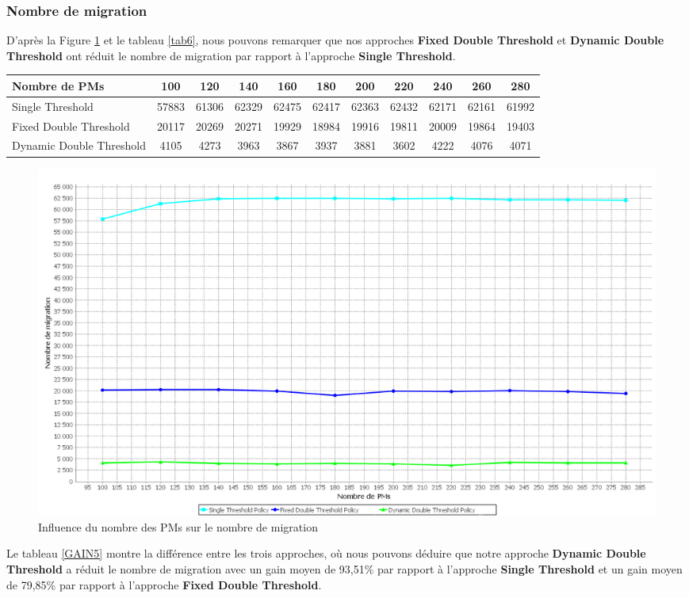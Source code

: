 \begin{onehalfspace}
\subsubsection{Nombre de migration}
D’après la Figure \ref{InNVMEnM1} et le tableau \ref{tab6}, nous pouvons remarquer que nos approches \textbf{Fixed Double Threshold} et \textbf{Dynamic Double Threshold} ont réduit le nombre de migration par rapport à l’approche \textbf{Single Threshold}.
\begin{center}
{\scriptsize   \begin{tabular}{|p{2.5cm}|c|c|c|c|c|c|c|c|c|c|}
\hline
      \centering     Nombre de PMs & 100& 120& 140& 160& 180& 200& 220& 240& 260& 280\\
\hline
      \centering      Single Threshold &  57883& 61306& 62329& 62475& 62417& 62363& 62432& 62171& 62161& 61992\\
\hline
      \centering      Fixed Double Threshold &  20117& 20269& 20271& 19929& 18984& 19916& 19811& 20009& 19864& 19403\\
\hline
      \centering     Dynamic Double Threshold &  4105& 4273& 3963& 3867& 3937& 3881& 3602& 4222& 4076& 4071\\
\hline
\end{tabular}}
\label{tab6}
\end{center}
\clearpage
\begin{figure}[!h]
\begin{center}
\includegraphics[scale=0.35]{figures/sh5.png} 
\end{center}
\caption{Influence du nombre des PMs sur le nombre de migration}
\label{InNVMEnM1}
\end{figure}


Le tableau \ref{GAIN5} montre la différence entre les trois approches, où nous pouvons déduire que notre approche \textbf{Dynamic Double Threshold} a réduit le nombre de migration avec un gain moyen de 93,51\% par rapport à l'approche \textbf{Single Threshold} et un gain moyen de 79,85\% par rapport à l'approche \textbf{Fixed Double Threshold}.\\


\end{onehalfspace}
